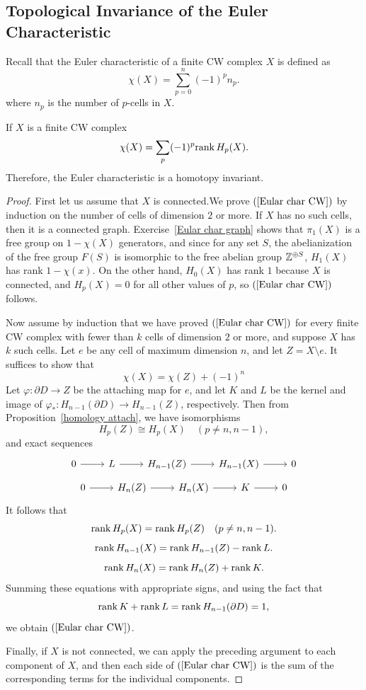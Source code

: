 \subsection{Topological Invariance of the Euler Characteristic}
Recall that the Euler characteristic of a finite CW complex $X$ is defined as
\[\chi(X)=\sum_{p=0}^{n}(-1)^pn_p.\]
where $n_p$ is the number of $p$-cells in $X$.
\begin{theorem}\label{Eular char}
If $X$ is a finite CW complex
\begin{align}\label{Eular char CW}
\chi(X)=\sum_{p}(-1)^p\mathrm{rank}\, H_p(X).
\end{align}
Therefore, the Euler characteristic is a homotopy invariant.
\end{theorem}
\begin{proof}
First let us assume that $X$ is connected.We prove $(\ref{Eular char CW})$ by induction on the number of cells of dimension $2$ or more. If $X$ has no such cells, then it is a connected graph. Exercise~\ref{Eular char graph} shows that $\pi_1(X)$ is a free group on $1-\chi(X)$ generators, and since for any set $S$, the abelianization of the free group $F(S)$ is isomorphic to the free abelian group $\mathbb{Z}^{\oplus S}$, $H_1(X)$ has rank $1-\chi(x)$. On the other hand, $H_0(X)$ has rank $1$ because $X$ is connected, and $H_p(X)=0$ for all other values of $p$, so $(\ref{Eular char CW})$ follows.\par
Now assume by induction that we have proved $(\ref{Eular char CW})$ for every finite CW complex with fewer than $k$ cells of dimension $2$ or more, and suppose $X$ has $k$ such cells. Let $e$ be any cell of maximum dimension $n$, and let $Z=X\setminus e$. It suffices to show that 
\[\chi(X)=\chi(Z)+(-1)^n\]
Let $\varphi:\partial D\to Z$ be the attaching map for $e$, and let $K$ and $L$ be the kernel and image of $\varphi_*:H_{n-1}(\partial D)\to H_{n-1}(Z)$, respectively. Then from Proposition~\ref{homology attach}, we have isomorphisms
\[H_p(Z)\cong H_p(X)\quad (p\neq n,n-1),\]
and exact sequences
\[\begin{tikzcd}
0\ar[r]&L\ar[r]&H_{n-1}(Z)\ar[r]&H_{n-1}(X)\ar[r]&0
\end{tikzcd}\]
\[\begin{tikzcd}
0\ar[r]&H_n(Z)\ar[r]&H_n(X)\ar[r]&K\ar[r]&0
\end{tikzcd}\]
It follows that
\[\mathrm{rank}\, H_p(X)=\mathrm{rank}\, H_p(Z)\quad(p\neq n,n-1).\]
\[\mathrm{rank}\, H_{n-1}(X)=\mathrm{rank}\, H_{n-1}(Z)-\mathrm{rank}\, L.\]
\[\mathrm{rank}\, H_n(X)=\mathrm{rank}\, H_n(Z)+\mathrm{rank}\, K.\]
Summing these equations with appropriate signs, and using the fact that \[\mathrm{rank}\, K+\mathrm{rank}\, L=\mathrm{rank}\, H_{n-1}(\partial D)=1,\] 
we obtain $(\ref{Eular char CW})$.\par
Finally, if $X$ is not connected, we can apply the preceding argument to each component of $X$, and then each side of $(\ref{Eular char CW})$ is the sum of the corresponding terms for the individual components.
\end{proof}
